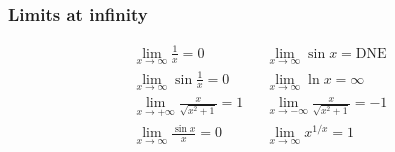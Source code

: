 \documentclass[main.tex]{subfiles}
\begin{document}
\begin{multicols}{2}
	\subsubsection*{Limits at infinity}
	\begin{align*}
		\lim_{x \to \infty} \frac{1}{x} = 0 && \lim_{x \to \infty} \sin{x} = \text{DNE} \\
		\lim_{x \to \infty} \sin{\frac{1}{x}} = 0 && \lim_{x \to \infty} \ln{x} = \infty \\
		\lim_{x \to +\infty} \frac{x}{\sqrt{x^2 + 1}} = 1 && \lim_{x \to -\infty} \frac{x}{\sqrt{x^2 + 1}} = -1 \\
		\lim_{x \to \infty} \frac{\sin{x}}{x} = 0 && \lim_{x \to \infty} x^{1/x} = 1
	\end{align*}
\end{multicols}
\end{document}
